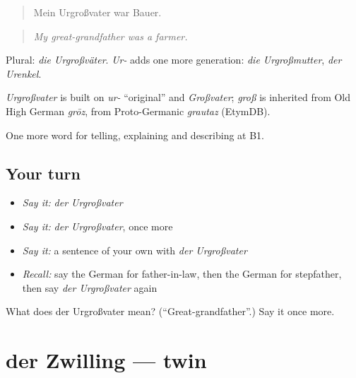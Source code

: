 \begin{quote}
Mein Urgroßvater war Bauer.
\end{quote}

\begin{quote}
\emph{My great-grandfather was a farmer.}
\end{quote}

Plural: \emph{die Urgroßväter}. \emph{Ur-} adds one more generation: \emph{die Urgroßmutter}, \emph{der Urenkel}.

\begin{cousinweb}
\emph{Urgroßvater} is built on \emph{ur-} \textquotedblleft{}original\textquotedblright{} and \emph{Großvater}; \emph{groß} is inherited from Old High German \emph{grōz}, from Proto-Germanic \emph{grautaz} (EtymDB).
\end{cousinweb}

\begin{grammarlens}[title={What you've built}]
One more word for telling, explaining and describing at B1.
\end{grammarlens}

\subsection*{Your turn}
\begin{itemize}
\raggedright
  \item \emph{Say it:} \emph{der Urgroßvater}
  \item \emph{Say it:} \emph{der Urgroßvater}, once more
  \item \emph{Say it:} a sentence of your own with \emph{der Urgroßvater}
  \item \emph{Recall:} say the German for father-in-law, then the German for stepfather, then say \emph{der Urgroßvater} again
\end{itemize}

\begin{tcolorbox}[breakable,colback=teal!4,colframe=teal!35!black,title={Before you move on}]
What does der Urgroßvater mean? (\textquotedblleft{}Great-grandfather\textquotedblright{}.) Say it once more.
\end{tcolorbox}
\section[der Zwilling]{der Zwilling — twin}

\label{lesson:GE-C490-zwilling}



